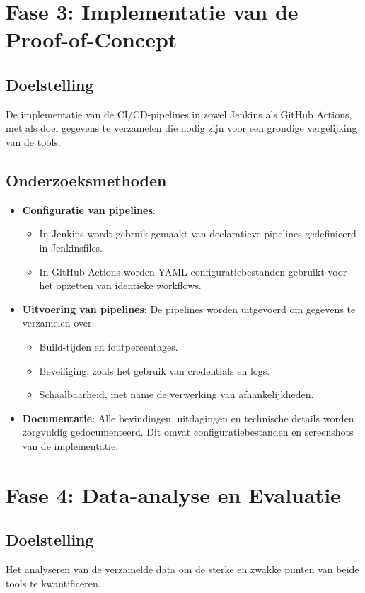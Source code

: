 \section{Fase 3: Implementatie van de Proof-of-Concept}
\subsection*{Doelstelling}
De implementatie van de CI/CD-pipelines in zowel Jenkins als GitHub Actions, met als doel gegevens te verzamelen die nodig zijn voor een grondige vergelijking van de tools.

\subsection*{Onderzoeksmethoden}
\begin{itemize}
    \item \textbf{Configuratie van pipelines}: 
    \begin{itemize}
        \item In Jenkins wordt gebruik gemaakt van declaratieve pipelines gedefinieerd in Jenkinsfiles.
        \item In GitHub Actions worden YAML-configuratiebestanden gebruikt voor het opzetten van identieke workflows.
    \end{itemize}
    \item \textbf{Uitvoering van pipelines}: De pipelines worden uitgevoerd om gegevens te verzamelen over:
    \begin{itemize}
        \item Build-tijden en foutpercentages.
        \item Beveiliging, zoals het gebruik van credentials en logs.
        \item Schaalbaarheid, met name de verwerking van afhankelijkheden.
    \end{itemize}
    \item \textbf{Documentatie}: Alle bevindingen, uitdagingen en technische details worden zorgvuldig gedocumenteerd. Dit omvat configuratiebestanden en screenshots van de implementatie.
\end{itemize}

\section{Fase 4: Data-analyse en Evaluatie}
\subsection*{Doelstelling}
Het analyseren van de verzamelde data om de sterke en zwakke punten van beide tools te kwantificeren.

